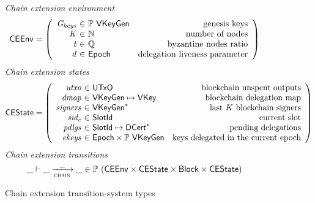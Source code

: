 \begin{figure}
  \emph{Chain extension environment}
  \begin{equation*}
    \CEEnv =
    \left(
      \begin{array}{r@{~\in~}lr}
        \var{\Gkeys} & \powerset{\VKeyGen} & \text{genesis keys}\\
        \var{K} & \mathbb{N} & \text{number of nodes}\\
        \var{t} & \mathbb{Q} & \text{byzantine nodes ratio}\\
        \var{d} & \Epoch & \text{delegation liveness parameter}\\
      \end{array}
    \right)
  \end{equation*}
  \emph{Chain extension states}
  \begin{equation*}
    \CEState =
    \left(
      \begin{array}{r@{~\in~}lr}
        \var{utxo} & \UTxO & \text{blockchain unspent outputs}\\
        \var{dmap} & \VKeyGen \mapsto \VKey & \text{blockchain delegation map}\\
        \var{signers} & \seqof{\VKeyGen} & \text{last $K$ blockchain signers}\\
        \var{sid_c} & \SlotId & \text{current slot}\\
        \var{pdlgs} & \SlotId \mapsto \seqof{\DCert} & \text{pending delegations}\\
        \var{ekeys} & \Epoch \times \powerset{\VKeyGen} & \text{keys delegated in the current epoch}
      \end{array}
    \right)
  \end{equation*}
  \emph{Chain extension transitions}
  \begin{equation*}
    \_ \vdash \_ \trans{chain}{\_} \_ \in
      \powerset (\CEEnv \times \CEState \times \Block \times \CEState)
  \end{equation*}
  \caption{Chain extension transition-system types}
  \label{fig:ts-types:chain-extension}
\end{figure}

